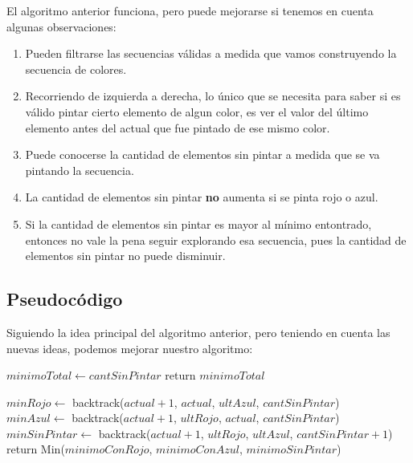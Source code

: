 El algoritmo anterior funciona, pero puede mejorarse si tenemos en cuenta algunas observaciones:

\begin{enumerate}
\item Pueden filtrarse las secuencias válidas a medida que vamos construyendo la secuencia de colores.
\item Recorriendo de izquierda a derecha, lo único que se necesita para saber si es válido pintar cierto elemento de algun color, es ver el valor del último elemento antes del actual que fue pintado de ese mismo color.
\item Puede conocerse la cantidad de elementos sin pintar a medida que se va pintando la secuencia.
\item La cantidad de elementos sin pintar \textbf{no} aumenta si se pinta rojo o azul.
\item Si la cantidad de elementos sin pintar es mayor al mínimo entontrado, entonces no vale la pena seguir explorando esa secuencia, pues la cantidad de elementos sin pintar no puede disminuir.
\end{enumerate}

\subsection{Pseudocódigo}

Siguiendo la idea principal del algoritmo anterior, pero teniendo en cuenta las nuevas ideas, podemos mejorar nuestro algoritmo:

\begin{algorithm}[H]
\begin{algorithmic}

    \State $minimoTotal \gets cantSinPintar$
    \State return $minimoTotal$
\Else

    \State $minRojo \gets$ backtrack($actual + 1$, $actual$, $ultAzul$, $cantSinPintar$)
  \EndIf \\

    \State $minAzul \gets$ backtrack($actual + 1$, $ultRojo$, $actual$, $cantSinPintar$)
  \EndIf \\

    \State $minSinPintar \gets$ backtrack($actual + 1$, $ultRojo$, $ultAzul$, $cantSinPintar + 1$)
  \EndIf \\

  \State return Min($minimoConRojo$, $minimoConAzul$, $minimoSinPintar$)

\EndIf
\EndProcedure
\end{algorithmic}
\end{algorithm}



